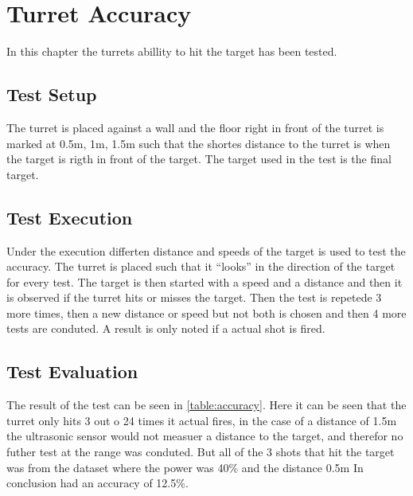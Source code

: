 \chapter{Turret Accuracy}
In this chapter the turrets abillity to hit the target has been tested.

\section{Test Setup}
The turret is placed against a wall and the floor right in front of the turret
is marked at 0.5m, 1m, 1.5m such that the shortes distance to the turret is when
the target is rigth in front of the target. The target used in the test is the final
target.

\section{Test Execution}
Under the execution differten distance and speeds of the target is used to test
the accuracy. The turret is placed such that it ``looks'' in the direction of
the target for every test. The target is then started with a speed and a
distance and then it is observed if the turret hits or misses the target. Then
the test is repetede 3 more times, then a new distance or speed but not both is
chosen and then 4 more tests are conduted. A result is only noted if a actual
shot is fired. 

\section{Test Evaluation}
The result of the test can be seen in \autoref{table:accuracy}. Here it can be
seen that the turret only hits 3 out o 24 times it actual fires, in the case of
a distance of 1.5m the ultrasonic sensor would not measuer a distance to the
target, and therefor no futher test at the range was conduted. But all of the
3 shots that hit the target was from
the dataset where the power was 40\% and the distance 0.5m  In conclusion \names
had an accuracy of 12.5\%.

